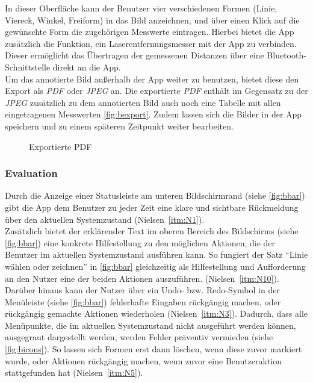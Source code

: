 In dieser Oberfläche kann der Benutzer vier verschiedenen Formen (Linie, Viereck, Winkel, Freiform) in das Bild anzeichnen, und über einen Klick auf die gewünschte Form die zugehörigen Messwerte eintragen.
Hierbei bietet die App zusätzlich die Funktion, ein Laserentfernungsmesser mit der App zu verbinden.
Dieser ermöglicht das Übertragen der gemessenen Distanzen über eine Bluetooth-Schnittstelle direkt an die App. \\

Um das annotierte Bild außerhalb der App weiter zu benutzen, bietet diese den Export als \emph{PDF} oder \emph{JPEG} an.
Die exportierte \emph{PDF} enthält im Gegensatz zu der \emph{JPEG} zusätzlich zu dem annotierten Bild auch noch eine Tabelle mit allen eingetragenen Messwerten \autoref{fig:bexport}. 
Zudem lassen sich die Bilder in der App speichern und zu einem späteren Zeitpunkt weiter bearbeiten.

\begin{figure}[h]
  \centering
  \caption{Exportierte PDF}\label{fig:bexport}
\end{figure}

\subsubsection{Evaluation}
Durch die Anzeige einer Statusleiste am unteren Bildschirmrand (siehe \autoref{fig:bbar}) gibt die App dem Benutzer zu jeder Zeit eine klare und sichtbare Rückmeldung über den aktuellen Systemzustand (Nielsen~\autoref{itm:N1}). \\

Zusätzlich bietet der erklärender Text im oberen Bereich des Bildschirms (siehe \autoref{fig:bbar}) eine konkrete Hilfestellung zu den möglichen Aktionen, die der Benutzer im aktuellen Systemzustand ausführen kann.
So fungiert der Satz ``Linie wählen oder zeichnen'' in \autoref{fig:bbar} gleichzeitig als Hilfestellung und Aufforderung an den Nutzer eine der beiden Aktionen auszuführen.
(Nielsen~\autoref{itm:N10}). \\

Darüber hinaus kann der Nutzer über ein Undo- bzw. Redo-Symbol in der Menüleiste (siehe \autoref{fig:bbar}) fehlerhafte Eingaben rückgängig machen, oder rückgängig gemachte Aktionen wiederholen (Nielsen~\autoref{itm:N3}).
Dadurch, dass alle Menüpunkte, die im aktuellen Systemzustand nicht ausgeführt werden können, ausgegraut dargestellt werden, werden Fehler präventiv vermieden (siehe \autoref{fig:bicons}).
So lassen sich Formen erst dann löschen, wenn diese zuvor markiert wurde, oder Aktionen rückgängig machen, wenn zuvor eine Benutzeraktion stattgefunden hat (Nielsen~\autoref{itm:N5}). \\


